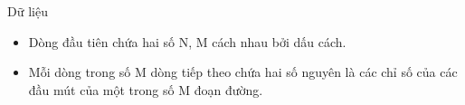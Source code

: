 Dữ liệu
\begin{itemize}
	\item     Dòng đầu tiên chứa hai số N, M cách nhau bởi dấu cách.   
	\item     Mỗi dòng trong số M dòng tiếp theo chứa hai số nguyên là các chỉ số của các đầu mút của một trong số M đoạn đường.   
\end{itemize}